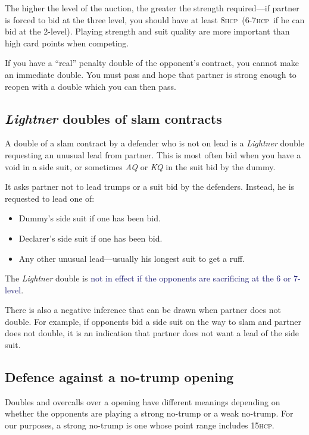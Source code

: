 \documentclass[a4paper,article,oneside]{memoir}
\newcommand{\hcp}{\textsc{hcp}}
\newcommand{\excp}[1]{\textcolor{MidnightBlue}{#1}} %
\begin{document}
The higher the level of the auction, the greater the strength
required---if partner is forced to bid at the three level, you should
have at least 8\hcp\ (6-7\hcp\ if he can bid at the 2-level).  Playing
strength and suit quality are more important than high card points
when competing.

If you have a ``real'' penalty double of the opponent's contract, you
cannot make an immediate double. You must pass and hope that partner
is strong enough to reopen with a double which you can then pass.

\subsection{\emph{Lightner} doubles of slam contracts}

A double of a slam contract by a defender who is not on lead is a
\emph{Lightner} double requesting an unusual lead from partner. This
is most often bid when you have a void in a side suit, or sometimes
\emph{AQ} or \emph{KQ} in the suit bid by the dummy.

It asks partner not to lead trumps or a suit bid by the
defenders. Instead, he is requested to lead one of:
\begin{itemize}
\item Dummy's side suit if one has been bid.
\item Declarer's side suit if one has been bid.
\item Any other unusual lead---usually his longest suit to get a
  ruff.
\end{itemize}

The \emph{Lightner} double is \excp{not in effect if the opponents are
  sacrificing at the 6 or 7-level}.

There is also a negative inference that can be drawn when partner does
not double. For example, if opponents bid a side suit on the way to
slam and partner does not double, it is an indication that partner
does not want a lead of the side suit.

\subsection{Defence against a no-trump opening}

Doubles and overcalls over a  opening have different meanings
depending on whether the opponents are playing a strong no-trump or a
weak no-trump. For our purposes, a strong no-trump is one whose point
range includes 15\hcp.
\end{document}

